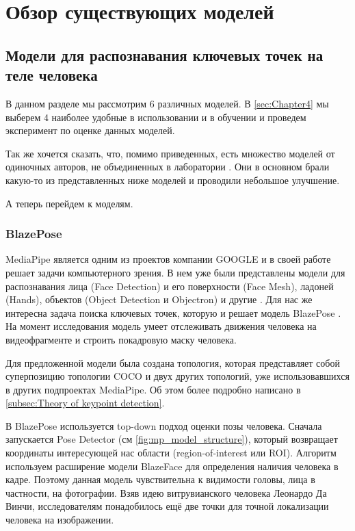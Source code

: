 \section{Обзор существующих моделей}
\label{sec:Chapter2} 

\subsection{Модели для распознавания ключевых точек на теле человека}

В данном разделе мы рассмотрим 6 различных моделей. В \autoref{sec:Chapter4} мы выберем 4 наиболее удобные в использовании и в обучении и проведем эксперимент по оценке данных моделей.

Так же хочется сказать, что, помимо приведенных, есть множество моделей от одиночных авторов, не объединенных в лаборатории \cite{pet_recognition, pet_classification}. Они в основном брали какую-то из представленных ниже моделей и проводили небольшое улучшение.

А теперь перейдем к моделям.

\subsubsection{BlazePose}

MediaPipe является одним из проектов компании GOOGLE и в своей работе решает задачи компьютерного зрения. В нем уже были представлены модели для распознавания лица (Face Detection) и его поверхности (Face Mesh), ладоней (Hands), объектов (Object Detection и Objectron) и другие \cite{mediapipe}. Для нас же интересна задача поиска ключевых точек, которую и решает модель BlazePose \cite{BlazePose}. На момент исследования модель умеет отслеживать движения человека на видеофрагменте и строить покадровую маску человека.

Для предложенной модели была создана топология, которая представляет собой суперпозицию топологии COCO и двух других топологий, уже использовавшихся в других подпроектах MediaPipe. Об этом более подробно написано в \autoref{subsec:Theory of keypoint detection}.

\hfill \break
В BlazePose используется top-down подход оценки позы человека. Сначала запускается Pose Detector (см \autoref{fig:mp_model_structure}), который возвращает координаты интересующей нас области (region-of-interest или ROI). Алгоритм используем расширение модели BlazeFace для определения наличия человека в кадре. Поэтому данная модель чувствительна к видимости головы, лица в частности, на фотографии. Взяв идею витрувианского человека Леонардо Да Винчи, исследователям понадобилось ещё две точки для точной локализации человека на изображении.

